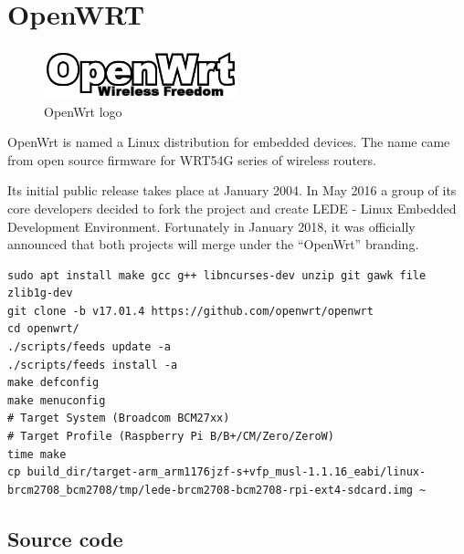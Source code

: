 \documentclass[printmode]{mgr}
\begin{document}
\section{OpenWRT}

\begin{figure}[htbp]
  \centering
    \includegraphics[width=0.5\textwidth]{openwrt-logo.png}
    \caption{OpenWrt logo}
  \label{fig:openwrt-logo}
\end{figure}

OpenWrt is named a Linux distribution for embedded devices. The name came from open source firmware for WRT54G series of wireless routers.

Its initial public release takes place at January 2004. In May 2016 a group of its core developers decided to fork the project and create LEDE - Linux Embedded Development Environment. Fortunately in January 2018, it was officially announced that both projects will merge under the ``OpenWrt'' branding.





\begin{lstlisting}
sudo apt install make gcc g++ libncurses-dev unzip git gawk file zlib1g-dev
git clone -b v17.01.4 https://github.com/openwrt/openwrt
cd openwrt/
./scripts/feeds update -a
./scripts/feeds install -a
make defconfig
make menuconfig
# Target System (Broadcom BCM27xx)
# Target Profile (Raspberry Pi B/B+/CM/Zero/ZeroW)
time make
cp build_dir/target-arm_arm1176jzf-s+vfp_musl-1.1.16_eabi/linux-brcm2708_bcm2708/tmp/lede-brcm2708-bcm2708-rpi-ext4-sdcard.img ~
\end{lstlisting}



\subsection*{Source code}
\end{document}
